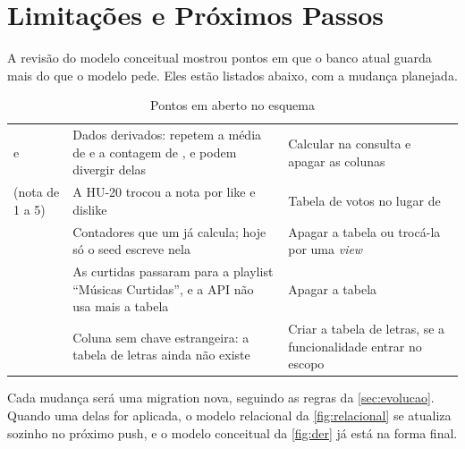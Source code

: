 \section{Limitações e Próximos Passos}
\label{sec:limitacoes}

A revisão do modelo conceitual mostrou pontos em que o banco atual guarda
mais do que o modelo pede. Eles estão listados abaixo, com a mudança
planejada.

\begin{table}[htbp]
  \centering
  \caption{Pontos em aberto no esquema}
  \label{tab:pendencias}
  \small
  \begin{tabularx}{\textwidth}{@{}L{0.8}L{1.15}L{1.05}@{}}
    \toprule
     &  &  \\
    \midrule
     e  & Dados derivados: repetem a média de  e a contagem de , e podem divergir delas & Calcular na consulta e apagar as colunas \\
     (nota de 1 a 5) & A HU-20 trocou a nota por like e dislike & Tabela de votos no lugar de  \\
     & Contadores que um  já calcula; hoje só o seed escreve nela & Apagar a tabela ou trocá-la por uma \emph{view} \\
     & As curtidas passaram para a playlist ``Músicas Curtidas'', e a API não usa mais a tabela & Apagar a tabela \\
     & Coluna sem chave estrangeira: a tabela de letras ainda não existe & Criar a tabela de letras, se a funcionalidade entrar no escopo \\
    \bottomrule
  \end{tabularx}
\end{table}

Cada mudança será uma migration nova, seguindo as regras da
\cref{sec:evolucao}. Quando uma delas for aplicada, o modelo relacional da
\cref{fig:relacional} se atualiza sozinho no próximo push, e o modelo
conceitual da \cref{fig:der} já está na forma final.
